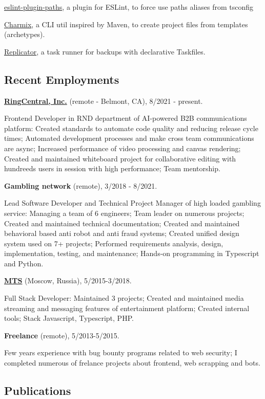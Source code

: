 \documentclass{vitonsky}
\begin{document}
\href{https://github.com/vitonsky/eslint-plugin-paths}{eslint-plugin-paths}, a plugin for ESLint, to force use paths aliases from tsconfig

\href{https://github.com/vitonsky/charmix}{Charmix}, a CLI util inspired
by Maven, to create project files from templates (archetypes).

\href{https://github.com/vitonsky/replicator}{Replicator}, a task runner
for backups with declarative Taskfiles.

\subsection*{Recent Employments}

\textbf{\href{https://www.ringcentral.com/}{RingCentral, Inc.}} (remote - Belmont, CA), 8/2021 - present.

Frontend Developer in RND department of AI-powered B2B communications platform: Created standards to automate code quality and reducing release cycle times; Automated development processes and make cross team communications are async; Increased performance of video processing and canvas rendering; Created and maintained whiteboard project for collaborative editing with hundreeds users in session with high performance; Team mentorship.

\textbf{Gambling network} (remote), 3/2018 - 8/2021.

Lead Software Developer and Technical Project Manager of high loaded gambling service: Managing a team of 6 engineers; Team leader on numerous projects; Created and maintained technical documentation; Created and maintained behavioral based anti robot and anti fraud systems; Created unified design system used on 7+ projects; Performed requirements analysis, design, implementation, testing, and maintenance; Hands-on programming in Typescript and Python.

\textbf{\href{https://mts.ru}{MTS}} (Moscow, Russia), 5/2015-3/2018.

Full Stack Developer: Maintained 3 projects; Created and maintained media streaming and messaging features of entertainment platform; Created internal tools; Stack Javascript, Typescript, PHP.

\textbf{Freelance} (remote), 5/2013-5/2015.

Few years experience with bug bounty programs related to web security; I completed numerous of frelance projects about frontend, web scrapping and bots.

\subsection*{Publications}
\end{document}
